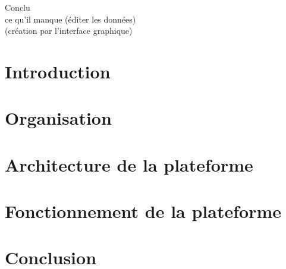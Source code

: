 \documentclass[a4paper]{report}
\begin{document}



\tableofcontents

	Conclu\\
		ce qu'il manque (éditer les données)\\
		(création par l'interface graphique)

	
\chapter*{Introduction}



\chapter{Organisation}

	

\chapter{Architecture de la plateforme}


\chapter{Fonctionnement de la plateforme}


\chapter*{Conclusion}
%
\end{document}
